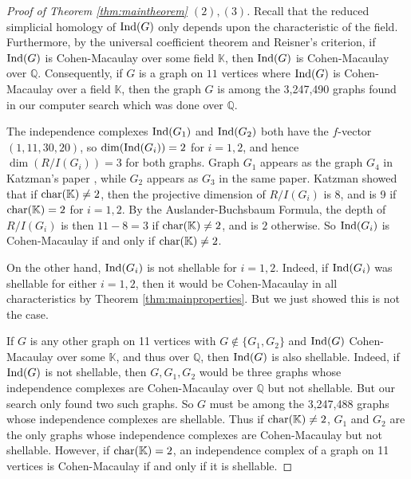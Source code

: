 \documentclass[12pt]{amsart}
\theoremstyle{plain}
\theoremstyle{definition}
\theoremstyle{remark}
\numberwithin{equation}{section}
\numberwithin{equation}{section}
\begin{document}
\begin{proof}[Proof of Theorem \ref{thm:maintheorem} $(2),(3)$]
Recall that the reduced simplicial homology 
of ${\rm Ind}(G)$ only depends
upon the characteristic of the field.   Furthermore,
by the universal coefficient theorem and Reisner's criterion,
if ${\rm Ind}(G)$ is Cohen-Macaulay over some field
$\mathbb{K}$, then ${\rm Ind}(G)$ is Cohen-Macaulay over
$\mathbb{Q}$.  Consequently, if $G$ is a graph on $11$
vertices where ${\rm Ind}(G)$ is 
Cohen-Macaulay over a field $\mathbb{K}$, then 
the graph $G$ is among
the 3,247,490 graphs found in our computer search
which was done over $\mathbb{Q}$.

The independence complexes ${\rm Ind}(G_1)$ and ${\rm Ind}(G_2)$ 
both have the $f$-vector $(1,11,30,20)$, so
$\dim({\rm Ind}(G_i))=2$ for $i=1,2$, and hence
$\dim(R/I(G_i))= 3$ for both graphs.   Graph $G_1$ appears as
the graph $G_4$ in Katzman's paper \cite{K2006}, 
while $G_2$ appears as $G_3$
in the same paper.  Katzman showed that if 
${\rm char}(\mathbb{K}) \neq 2$,
then the projective dimension of $R/I(G_i)$ is 8, and is 9 if 
${\rm char}(\mathbb{K}) = 2$ for $i=1,2$. 
By the Auslander-Buchsbaum Formula,
the depth of $R/I(G_i)$ is then 
$11-8=3$ if  ${\rm char}(\mathbb{K}) \neq 2$, and is $2$ otherwise.  So ${\rm Ind}(G_i)$ is
Cohen-Macaulay if and only if ${\rm char}(\mathbb{K}) \neq 2$.  

On the other hand, ${\rm Ind}(G_i)$ is not shellable for $i=1,2$.
Indeed, if ${\rm Ind}(G_i)$ was shellable for either $i=1,2$, then it would be Cohen-Macaulay in all characteristics by Theorem \ref{thm:mainproperties}. But we just showed this is not the case.

 If $G$ is any other graph on 11 vertices
 with $G \not\in \{G_1,G_2\}$ and ${\rm Ind}(G)$ Cohen-Macaulay
 over some $\mathbb{K}$, and thus over $\mathbb{Q}$, 
 then ${\rm Ind}(G)$ is also shellable.  Indeed,
 if ${\rm Ind}(G)$ is not shellable, then $G,G_1,G_2$ would
 be three graphs whose independence complexes are
 Cohen-Macaulay over
 $\mathbb{Q}$ but not shellable.  But our search only found two
 such graphs.  So $G$ must be among the 3,247,488
 graphs whose independence complexes are shellable.  Thus
 if ${\rm char}(\mathbb{K}) \neq 2$, $G_1$ and $G_2$
 are the only graphs whose independence complexes are Cohen-Macaulay
 but not shellable. However, if ${\rm char}(\mathbb{K}) =2$,
an independence complex of a graph on 11 vertices
is Cohen-Macaulay if and only if it is shellable.
\end{proof}
\end{document}
